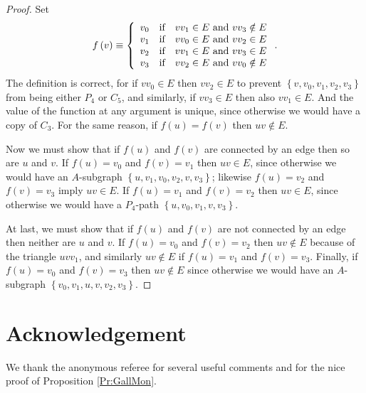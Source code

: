 \documentclass[12pt]{amsart}
\theoremstyle{plain}
\numberwithin{equation}{section}
\begin{document}
\begin{proof}
Set
\begin{displaymath}
    f\left(  v\right)  \equiv\left\{
    \begin{array}
    [c]{lll}
    v_{0} & \text{if} & vv_{1}\in E\text{ and }vv_{3}\notin E\\
    v_{1} & \text{if} & vv_{0}\in E\text{ and }vv_{2}\in E\\
    v_{2} & \text{if} & vv_{1}\in E\text{ and }vv_{3}\in E\\
    v_{3} & \text{if} & vv_{2}\in E\text{ and }vv_{0}\notin E
    \end{array}
\right.  .
\end{displaymath}
The definition is correct, for if $vv_{0}\in E$ then $vv_{2}\in E$ to prevent
$\left\{  v,v_{0},v_{1},v_{2},v_{3}\right\}  $ from being either $P_{4}$ or
$C_{5}$, and similarly, if $vv_{3}\in E$ then also $vv_{1}\in E$. And the
value of the function at any argument is unique, since otherwise we would have
a copy of $C_{3}$. For the same reason, if $f(u)=f(v)$ then $uv\notin E$.

Now we must show that if $f\left(  u\right)  $ and $f\left(  v\right)  $ are
connected by an edge then so are $u$ and $v$. If $f(u)=v_{0}$ and $f(v)=v_{1}$
then $uv\in E$, since otherwise we would have an $A$-subgraph $\left\{
u,v_{1},v_{0},v_{2},v,v_{3}\right\}  $; likewise $f(u)=v_{2}$ and $f(v)=v_{3}$
imply $uv\in E$. If $f(u)=v_{1}$ and $f(v)=v_{2}$ then $uv\in E$, since
otherwise we would have a $P_{4}$-path $\left\{  u,v_{0},v_{1},v,v_{3} \right\}
$.

At last, we must show that if $f\left(  u\right)  $ and $f\left(  v\right)  $
are not connected by an edge then neither are $u$ and $v$.  If $f(u)=v_{0}$
and $f(v)=v_{2}$ then $uv\notin E$ because of the triangle $uvv_{1}$, and
similarly $uv\notin E$ if $f(u)=v_{1}$ and $f(v)=v_{3}$. Finally, if
$f(u)=v_{0}$ and $f(v)=v_{3}$ then $uv\notin E$ since otherwise we would have
an $A$-subgraph $\left\{  v_{0},v_{1},u,v,v_{2},v_{3}\right\}  $.
\end{proof}

\section{Acknowledgement}

We thank the anonymous referee for several useful comments and for the nice
proof of Proposition \ref{Pr:GallMon}.
\end{document}

